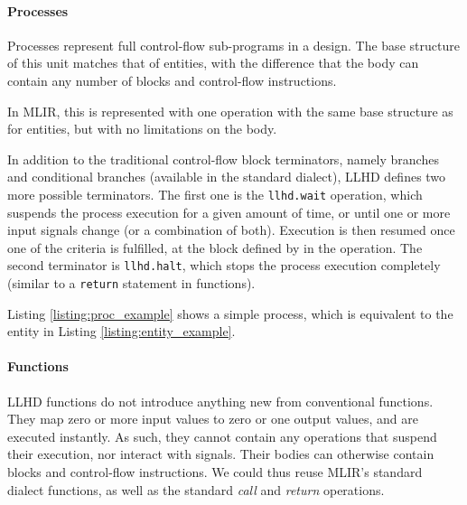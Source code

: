 
\paragraph{Processes}
Processes represent full control-flow sub-programs in a design. The base structure of this unit matches that of entities, with the difference that the body can contain any number of blocks and control-flow instructions.

In MLIR, this is represented with one operation with the same base structure as for entities, but with no limitations on the body.

In addition to the traditional control-flow block terminators, namely branches and conditional branches (available in the standard dialect), LLHD defines two more possible terminators. The first one is the \texttt{llhd.wait} operation, which suspends the process execution for a given amount of time, or until one or more input signals change (or a combination of both). Execution is then resumed once one of the criteria is fulfilled, at the block defined by in the operation. The second terminator is \texttt{llhd.halt}, which stops the process execution completely (similar to a \texttt{return} statement in functions).

Listing \ref{listing:proc_example} shows a simple process, which is equivalent to the entity in Listing \ref{listing:entity_example}.


\paragraph{Functions}
LLHD functions do not introduce anything new from conventional functions. They map zero or more input values to zero or one output values, and are executed instantly. As such, they cannot contain any operations that suspend their execution, nor interact with signals. Their bodies can otherwise contain blocks and control-flow instructions. We could thus reuse MLIR's standard dialect functions, as well as the standard \textit{call} and \textit{return} operations.

